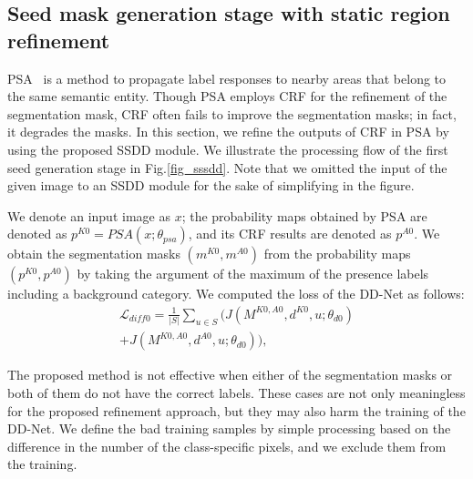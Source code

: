 \documentclass[10pt,twocolumn,letterpaper]{article}
\begin{document}
\subsection{Seed mask generation stage with static region refinement\label{static}}
PSA~\cite{psa} is a method to propagate label responses 
to nearby areas that belong to the same semantic entity.
Though PSA employs CRF for the refinement of the segmentation mask, CRF often fails to improve the segmentation masks; in fact, it degrades the masks.
In this section, we refine the outputs of CRF in PSA by using the proposed SSDD module.
We illustrate the processing flow of the first seed generation stage in Fig.\ref{fig_sssdd}.
Note that we omitted the input of the given image to an SSDD module for the sake of simplifying in the figure.

We denote an input image as $x$; the probability maps obtained by PSA are denoted as 
$p^{K0}=PSA(x;\theta_{psa})$, and its CRF results are denoted as $p^{A0}$.
We obtain the segmentation masks $(m^{K0},m^{A0})$ from the probability maps $(p^{K0},p^{A0})$ by taking the argument of the maximum of the presence labels including a background category.
We computed the loss of the DD-Net as follows:
\begin{equation}
\begin{split}
{\mathcal L}_{\mathit{diff0}} = \frac{1}{|S|}\displaystyle{\sum_{u \in S}} (J(M^{K0,A0},d^{K0},u;\theta_{d0})\\
+ J(M^{K0,A0},d^{A0}, u;\theta_{d0})),
\end{split}
\end{equation}

The proposed method is not effective when either of the segmentation masks or both of them do not have the correct labels.
These cases are not only meaningless for the proposed refinement approach, but they may also harm the training of the DD-Net. 
We define the bad training samples by simple processing based on the difference in the number of the class-specific pixels, and  we exclude them from the training.
\end{document}
